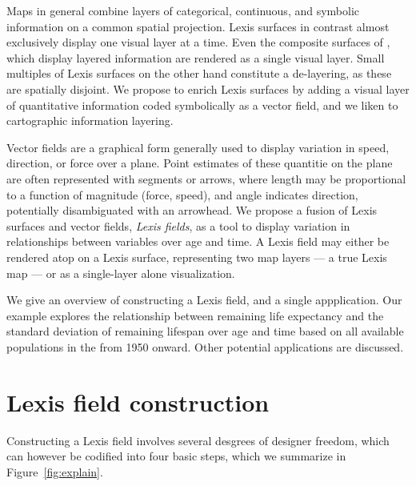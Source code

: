 \documentclass{article}
\begin{document}
Maps in general combine layers of categorical, continuous, and
symbolic information on a common spatial projection. Lexis surfaces in contrast almost exclusively display one visual layer at a time. Even the composite surfaces of \citet{scholey2017visualizing}, which display layered information are rendered as a single visual layer. Small multiples of Lexis surfaces on the other hand constitute a de-layering, as these are spatially disjoint. We propose to enrich Lexis surfaces by adding a visual layer of quantitative information coded symbolically as a vector field, and we liken to cartographic information layering.

Vector fields are a graphical form generally used to display variation in speed,
direction, or force over a plane. Point estimates of these quantitie on the plane are
often represented with segments or arrows, where length may be proportional to a function of
magnitude (force, speed), and angle indicates direction, potentially disambiguated with an arrowhead. We propose a fusion of Lexis surfaces and vector fields, \emph{Lexis fields}, as a tool to
display variation in relationships between variables over age and time. A Lexis field may either be rendered atop on a Lexis surface, representing two map layers --- a true Lexis map --- or as a single-layer alone visualization. 

We give an overview of constructing a Lexis field, and a single appplication. Our example explores the relationship between remaining life expectancy and
the standard deviation of remaining lifespan over age and time based on all
available populations in the \citet{HMD} from 1950 onward. Other potential applications are discussed.

\section{Lexis field construction}

Constructing a Lexis field involves several desgrees of designer freedom, which can however be codified into four basic steps, which we summarize in Figure~\ref{fig:explain}.
\end{document}
